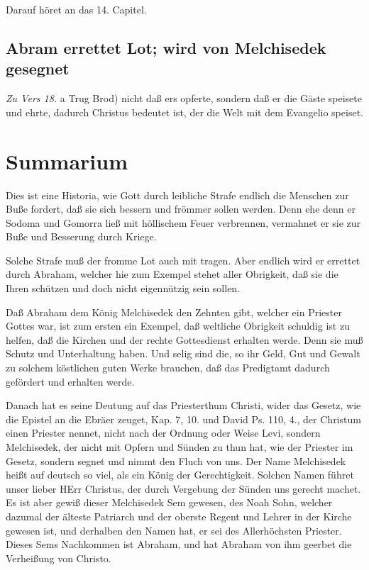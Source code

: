 Darauf höret an das 14. Capitel.

\subsection{Abram errettet Lot; wird von Melchisedek gesegnet}

\emph{Zu Vers 18.} a Trug Brod) nicht daß ers opferte, sondern daß er die Gäste speisete und ehrte, dadurch Christus bedeutet ist, der die Welt mit dem Evangelio speiset.

\section{Summarium}

Dies ist eine Historia, wie Gott durch leibliche Strafe endlich die Menschen zur Buße fordert, daß sie sich bessern und frömmer sollen werden. Denn ehe denn er Sodoma und Gomorra ließ mit höllischem Feuer verbrennen, vermahnet er sie zur Buße und Besserung durch Kriege.

Solche Strafe muß der fromme Lot auch mit tragen. Aber endlich wird er errettet durch Abraham, welcher hie zum Exempel stehet aller Obrigkeit, daß sie die Ihren schützen und doch nicht eigennützig sein sollen.

Daß Abraham dem König Melchisedek den Zehnten gibt, welcher ein Priester Gottes war, ist zum ersten ein Exempel, daß weltliche Obrigkeit schuldig ist zu helfen, daß die Kirchen und der rechte Gottesdienst erhalten werde. Denn sie muß Schutz und Unterhaltung haben. Und selig sind die, so ihr Geld, Gut und Gewalt zu solchem köstlichen guten Werke brauchen, daß das Predigtamt dadurch gefördert und erhalten werde.

Danach hat es seine Deutung auf das Priesterthum Christi, wider das Gesetz, wie die Epistel an die Ebräer zeuget, Kap. 7, 10. und David Ps. 110, 4., der Christum einen Priester nennet, nicht nach der Ordnung oder Weise Levi, sondern Melchisedek, der nicht mit Opfern und Sünden zu thun hat, wie der Priester im Gesetz, sondern segnet und nimmt den Fluch von uns. Der Name Melchisedek heißt auf deutsch so viel, als ein König der Gerechtigkeit. Solchen Namen führet unser lieber HErr Christus, der durch Vergebung der Sünden uns gerecht machet. Es ist aber gewiß dieser Melchisedek Sem gewesen, des Noah Sohn, welcher dazumal der älteste Patriarch und der oberste Regent und Lehrer in der Kirche gewesen ist, und derhalben den Namen hat, er sei des Allerhöchsten Priester. Dieses Sems Nachkommen ist Abraham, und hat Abraham von ihm geerbet die Verheißung von Christo.

